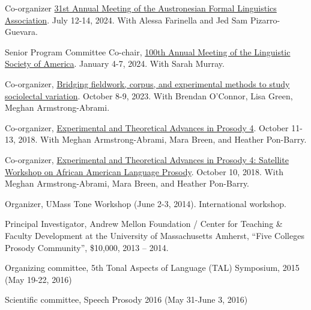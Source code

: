 \documentclass[10pt]{article}
\newcommand{\halfblankline}{\quad\vspace{-0.5\baselineskip}\pagebreak[3]}
\begin{document}
    \begin{innerlist}

    \item Co-organizer \href{https://websites.umass.edu/afla31/}{31st Annual Meeting of the Austronesian Formal Linguistics Association}. July 12-14, 2024. With Alessa Farinella and Jed Sam Pizarro-Guevara.
    \item Senior Program Committee Co-chair, \href{https://www.lsadc.org//Files/AM_Handbooks/2024%20Handbook-as-of-Dec_4.pdf}{100th Annual Meeting of the Linguistic Society of America}. January 4-7, 2024. With Sarah Murray.

    \item Co-organizer, \href{https://websites.umass.edu/bridging-socio/}{Bridging fieldwork, corpus, and experimental methods to study sociolectal variation}. October 8-9, 2023. With Brendan O'Connor, Lisa Green, Meghan Armstrong-Abrami.

    \item Co-organizer, \href{https://etap4.krisyu.org}{Experimental and Theoretical Advances in
        Prosody 4}. October 11-13, 2018. With Meghan Armstrong-Abrami, Mara Breen, and Heather Pon-Barry.

    \item Co-organizer, \href{https://etap4.krisyu.org/aae}{Experimental and Theoretical Advances in
        Prosody 4: Satellite Workshop on African American Language Prosody}. October 10, 2018. With Meghan Armstrong-Abrami, Mara Breen, and Heather Pon-Barry.

        \item Organizer, UMass Tone Workshop (June 2-3,
          2014). International workshop.
        \begin{innerlist}[\enskip$\circ$,leftmargin=*]
            \item Principal Investigator, Andrew Mellon Foundation / Center for Teaching \& Faculty
      Development at the University of Massachusetts Amherst, ``Five
      Colleges Prosody Community'', \$10,000, 2013 -- 2014.
        \end{innerlist}

        \halfblankline

        \item Organizing committee, 5th Tonal Aspects of Language (TAL)
          Symposium, 2015 (May 19-22, 2016)

        \item Scientific committee, Speech Prosody 2016 (May 31-June
          3, 2016)

        \end{innerlist}
\end{document}
